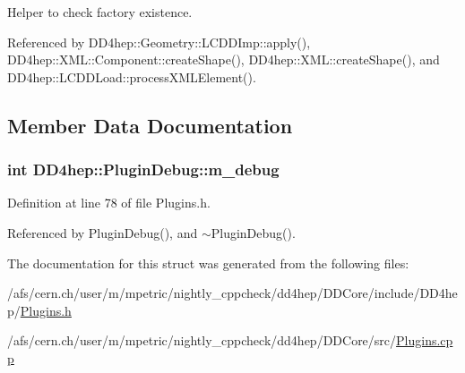 Helper to check factory existence. 

Referenced by DD4hep::Geometry::LCDDImp::apply(), DD4hep::XML::Component::createShape(), DD4hep::XML::createShape(), and DD4hep::LCDDLoad::processXMLElement().

\subsection{Member Data Documentation}
\hypertarget{struct_d_d4hep_1_1_plugin_debug_afb83475b5c5eb7cb5410b94972627a20}{
\subsubsection[{m\_\-debug}]{\setlength{\rightskip}{0pt plus 5cm}int {\bf DD4hep::PluginDebug::m\_\-debug}}}
\label{struct_d_d4hep_1_1_plugin_debug_afb83475b5c5eb7cb5410b94972627a20}


Definition at line 78 of file Plugins.h.

Referenced by PluginDebug(), and $\sim$PluginDebug().

The documentation for this struct was generated from the following files:\begin{DoxyCompactItemize}
\item 
/afs/cern.ch/user/m/mpetric/nightly\_\-cppcheck/dd4hep/DDCore/include/DD4hep/\hyperlink{_plugins_8h}{Plugins.h}\item 
/afs/cern.ch/user/m/mpetric/nightly\_\-cppcheck/dd4hep/DDCore/src/\hyperlink{_plugins_8cpp}{Plugins.cpp}\end{DoxyCompactItemize}
